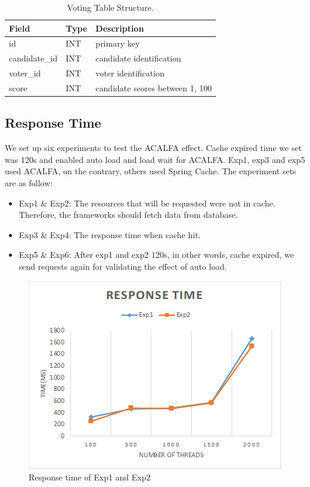 \documentclass[conference]{IEEEtran}
\begin{document}
\begin{table}[htb]
\begin{center}
 \caption{\label{VTS}Voting Table Structure.}
 \begin{tabular}{lll}
 \toprule
    Field & Type & Description\\
 \midrule
    id & INT & primary key\\
    candidate\_id & INT & candidate identification\\
    voter\_id & INT & voter identification\\
    score & INT & candidate scores between 1, 100\\
\bottomrule
 \end{tabular}
\end{center}
\end{table}

\subsection{Response Time}

We set up six experiments to test the ACALFA effect. Cache expired time we set was 120s and enabled auto load and load wait for ACALFA. Exp1, exp3 and exp5 used ACALFA, on the contrary, others used Spring Cache. The experiment sets are as follow:

\begin{itemize}
    \item Exp1 \& Exp2: The resources that will be requested were not in cache. Therefore, the frameworks should fetch data from database.
    \item Exp3 \& Exp4: The response time when cache hit.
    \item Exp5 \& Exp6: After exp1 and exp2 120s, in other words, cache expired, we send requests again for validating the effect of auto load.
\end{itemize}

\begin{figure} [htb]
    \centering
    \includegraphics[width=1\linewidth]{img/exp1-2.png}
    \caption{Response time of Exp1 and Exp2}
    \label{exp1-2}
\end{figure}
\end{document}
